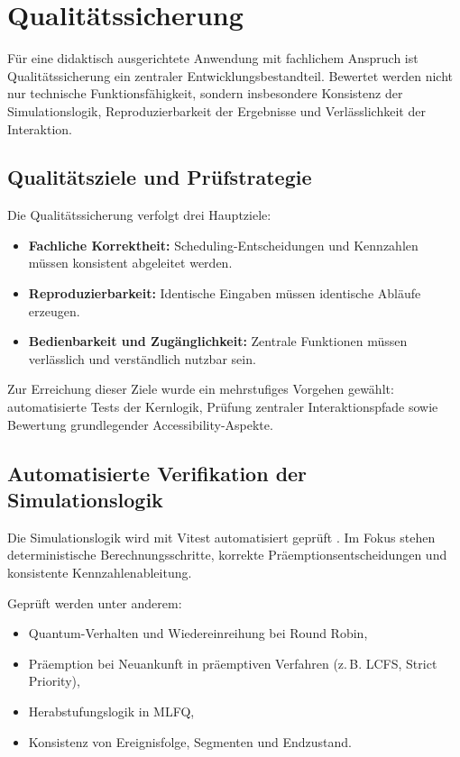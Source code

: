 \chapter{Qualitätssicherung}

Für eine didaktisch ausgerichtete Anwendung mit fachlichem Anspruch ist Qualitätssicherung ein zentraler Entwicklungsbestandteil. Bewertet werden nicht nur technische Funktionsfähigkeit, sondern insbesondere Konsistenz der Simulationslogik, Reproduzierbarkeit der Ergebnisse und Verlässlichkeit der Interaktion.

\section{Qualitätsziele und Prüfstrategie}

Die Qualitätssicherung verfolgt drei Hauptziele:

\begin{itemize}
    \item \textbf{Fachliche Korrektheit:} Scheduling-Entscheidungen und Kennzahlen müssen konsistent abgeleitet werden.
    \item \textbf{Reproduzierbarkeit:} Identische Eingaben müssen identische Abläufe erzeugen.
    \item \textbf{Bedienbarkeit und Zugänglichkeit:} Zentrale Funktionen müssen verlässlich und verständlich nutzbar sein.
\end{itemize}

Zur Erreichung dieser Ziele wurde ein mehrstufiges Vorgehen gewählt: automatisierte Tests der Kernlogik, Prüfung zentraler Interaktionspfade sowie Bewertung grundlegender Accessibility-Aspekte.

\section{Automatisierte Verifikation der Simulationslogik}

Die Simulationslogik wird mit Vitest automatisiert geprüft \cite{vitestdocs}. Im Fokus stehen deterministische Berechnungsschritte, korrekte Präemptionsentscheidungen und konsistente Kennzahlenableitung.

Geprüft werden unter anderem:

\begin{itemize}
    \item Quantum-Verhalten und Wiedereinreihung bei Round Robin,
    \item Präemption bei Neuankunft in präemptiven Verfahren (z.\,B. LCFS, Strict Priority),
    \item Herabstufungslogik in MLFQ,
    \item Konsistenz von Ereignisfolge, Segmenten und Endzustand.
\end{itemize}

